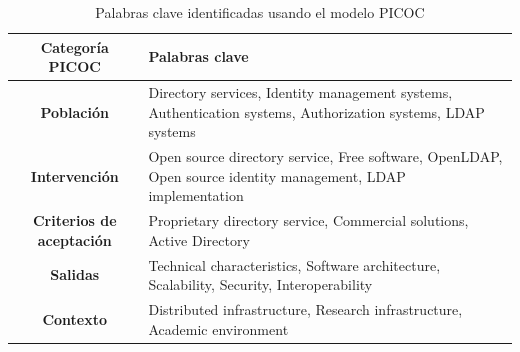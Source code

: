 \begin{table}[H]
	\centering
	\caption{Palabras clave identificadas usando el modelo PICOC}
	\label{tab:palabras-clave-picoc}

	\renewcommand{\arraystretch}{1.2}
	\fontsize{9pt}{10pt}\selectfont

	\begin{tabularx}{\textwidth}{|c|X|}
		\hline
		\tableheader
		\textbf{Categoría PICOC}         &
		\textbf{Palabras clave}
		\\
		\hline
		\textbf{Población}               &
		Directory services, Identity management systems, Authentication systems, Authorization systems, LDAP systems
		\\
		\hline
		\textbf{Intervención}            &
		Open source directory service, Free software, OpenLDAP, Open source identity management, LDAP implementation
		\\
		\hline
		\textbf{Criterios de aceptación} &
		Proprietary directory service, Commercial solutions, Active Directory
		\\
		\hline
		\textbf{Salidas}                 &
		Technical characteristics, Software architecture, Scalability, Security, Interoperability
		\\
		\hline
		\textbf{Contexto}                &
		Distributed infrastructure, Research infrastructure, Academic environment
		\\
		\hline
	\end{tabularx}
\end{table}
